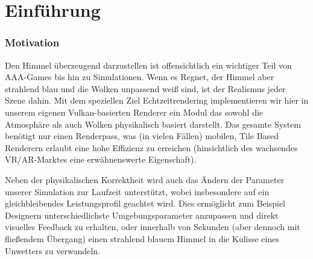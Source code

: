\part{Einführung}
\section{Motivation}
Den Himmel überzeugend darzustellen ist offensichtlich ein wichtiger Teil von AAA-Games bis hin zu Simulationen. Wenn es
Regnet, der Himmel aber strahlend blau und die Wolken unpassend weiß sind, ist der Realismus jeder Szene dahin. Mit dem
speziellen Ziel Echtzeitrendering implementieren wir hier in unserem eigenen Vulkan-basierten Renderer ein Modul das
sowohl die Atmosphäre als auch Wolken physikalisch basiert darstellt. Das gesamte System benötigt nur einen Renderpass,
was (in vielen Fällen) mobilen, Tile Based Renderern erlaubt eine hohe Effizienz zu erreichen (hinsichtlich des
wachsendes VR/AR-Marktes eine erwähnenswerte Eigenschaft).

Neben der physikalischen Korrektheit wird auch das Ändern der Parameter unserer Simulation zur Laufzeit unterstützt,
wobei insbesondere auf ein gleichbleibendes Leistungsprofil geachtet wird. Dies ermöglicht zum Beispiel Designern
unterschiedlichste Umgebungsparameter anzupassen und direkt visuelles Feedback zu erhalten, oder innerhalb von Sekunden
(aber dennoch mit fließendem Übergang) einen strahlend blauem Himmel in die Kulisse eines Unwetters zu verwandeln.

\clearpage
